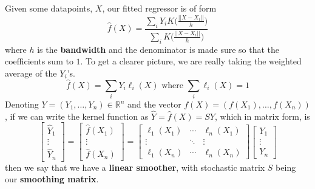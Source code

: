     \begin{definition}
      Given some datapoints, $X$, our fitted regressor is of form 
      \begin{equation}
        \hat{f} (X) = \frac{\sum_{i} Y_i K \bigg( \frac{||X - X_i||}{h} \bigg)}{\sum_{i} K \bigg( \frac{||X - X_i||}{h} \bigg)}
      \end{equation}
      where $h$ is the \textbf{bandwidth} and the denominator is made sure so that the coefficients sum to $1$. To get a clearer picture, we are really taking the weighted average of the $Y_i$'s. 
      \begin{equation}
        \hat{f} (X) = \sum_{i} Y_i \ell_i (X) \text{ where } \sum_{i} \ell_i (X) = 1
      \end{equation}
      Denoting $Y = (Y_1, \ldots, Y_n) \in \mathbb{R}^n$ and the vector $f(X) = (f(X_1), \ldots, f(X_n))$, if we can write the kernel function as $\hat{Y} = \hat{f}(X) = S Y$, which in matrix form, is 
      \begin{equation}
        \begin{bmatrix} \hat{Y}_1 \\ \vdots \\ \hat{Y}_n \end{bmatrix} = \begin{bmatrix} \hat{f}(X_1) \\ \vdots \\ \hat{f} (X_n) \end{bmatrix} = \begin{bmatrix} \ell_1 (X_1) & \cdots & \ell_n (X_1) \\ \vdots & \ddots & \vdots \\ \ell_1 (X_n) & \cdots & \ell_n (X_n) \end{bmatrix} \begin{bmatrix} Y_1 \\ \vdots \\ Y_n \end{bmatrix} 
      \end{equation}
      then we say that we have a \textbf{linear smoother}, with stochastic matrix $S$ being our \textbf{smoothing matrix}. 
    \end{definition}

